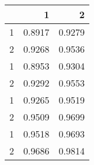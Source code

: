 \begin{tabular}{lrr}
\toprule
{} &       1 &       2 \\
\midrule
1 &  0.8917 &  0.9279 \\
2 &  0.9268 &  0.9536 \\
1 &  0.8953 &  0.9304 \\
2 &  0.9292 &  0.9553 \\
1 &  0.9265 &  0.9519 \\
2 &  0.9509 &  0.9699 \\
1 &  0.9518 &  0.9693 \\
2 &  0.9686 &  0.9814 \\
\bottomrule
\end{tabular}
